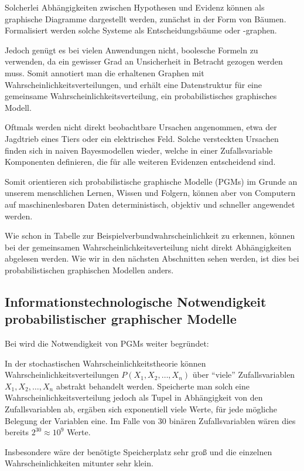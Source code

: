 \documentclass{llncs}
\begin{document}
Solcherlei Abhängigkeiten zwischen Hypothesen und Evidenz können als graphische Diagramme dargestellt werden, zunächst in der Form von Bäumen. Formalisiert werden solche Systeme als Entscheidungsbäume oder -graphen. 

Jedoch genügt es bei vielen Anwendungen nicht, boolesche Formeln zu verwenden, da ein gewisser Grad an Unsicherheit in Betracht gezogen werden muss. Somit annotiert man die erhaltenen Graphen mit  Wahrscheinlichkeitsverteilungen, und erhält eine Datenstruktur für eine gemeinsame Wahrscheinlichkeitsverteilung, ein probabilistisches graphisches Modell. 

Oftmals werden nicht direkt beobachtbare Ursachen angenommen, etwa der Jagdtrieb eines Tiers oder ein elektrisches Feld. Solche versteckten Ursachen finden sich in naiven Bayesmodellen wieder, welche in einer Zufallsvariable Komponenten definieren, die für alle weiteren Evidenzen entscheidend sind. 

Somit orientieren sich probabilistische graphische Modelle (PGMs) im Grunde an unserem menschlichen Lernen, Wissen und Folgern, können aber von Computern auf maschinenlesbaren Daten deterministisch, objektiv und schneller angewendet werden.

Wie schon in Tabelle zur Beispielverbundwahrscheinlichkeit zu erkennen, können bei der gemeinsamen Wahrscheinlichkeitsverteilung nicht direkt Abhängigkeiten abgelesen werden. Wie wir in den nächsten Abschnitten sehen werden, ist dies bei probabilistischen graphischen Modellen anders. 

\subsection{Informationstechnologische Notwendigkeit probabilistischer graphischer Modelle}

Bei \cite{koller2009probabilistic} wird die Notwendigkeit von PGMs weiter begründet: 

In der stochastischen Wahrscheinlichkeitstheorie können Wahrscheinlichkeitsverteilungen $P(X_1,X_2,\dots,X_n)$ über "`viele"' Zufallsvariablen $X_1,X_2,\dots,X_n$ abstrakt behandelt werden. Speicherte man solch eine Wahrscheinlichkeitsverteilung jedoch als Tupel in Abhängigkeit von den Zufallsvariablen ab, ergäben sich exponentiell viele Werte, für jede mögliche Belegung der Variablen eine. Im Falle von $30$ binären Zufallsvariablen wären dies bereits $2^{30} \approx 10^9 $ Werte. 

Insbesondere wäre der benötigte Speicherplatz sehr groß und die einzelnen Wahrscheinlichkeiten mitunter sehr klein. 
\end{document}
